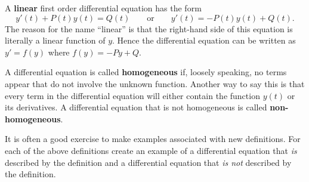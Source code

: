 \begin{definition}
    A {\bf linear} first order differential equation has the form
    \[ y'(t) + P(t) y(t) = Q(t) \qquad \text{or} \qquad y'(t) = -P(t) y(t) + Q(t). \]
    The reason for the name ``linear'' is that the right-hand side of this equation is
    literally a linear function of $y$.  Hence the differential equation can be written as
    $y' = f(y)$ where $f(y) = -Py + Q.$
\end{definition}

\begin{definition}
    A differential equation is called {\bf homogeneous} if, loosely speaking, no terms appear
    that do not involve the unknown function.  Another way to say this is that every term
    in the differential equation will either contain the function $y(t)$ or its
    derivatives.  A differential equation that is not homogeneous is called {\bf
    non-homogeneous}.
\end{definition}
\begin{problem}
    It is often a good exercise to make examples associated with new definitions.  For
    each of the above definitions create an example of a differential equation that {\it
    is} described by the definition and a differential equation that {\it is not}
    described by the definition.
\end{problem}

